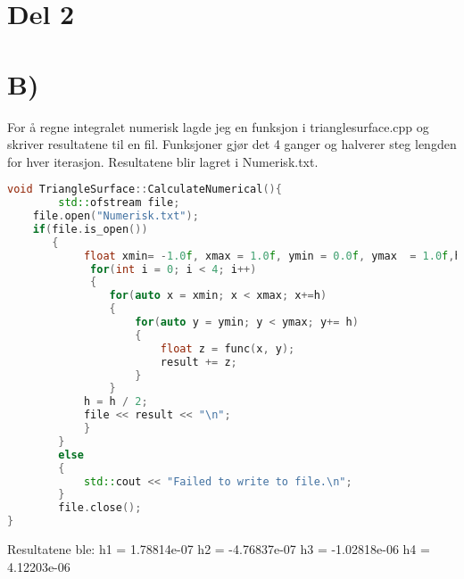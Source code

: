 \documentclass[a4paper,norsk]{article}
\begin{document}
\section{Del 2}
\section{B)}
For å regne integralet numerisk lagde jeg en funksjon i trianglesurface.cpp og skriver resultatene til en fil.
Funksjoner gjør det 4 ganger og halverer steg lengden for hver iterasjon. Resultatene blir lagret i Numerisk.txt.
\begin{lstlisting}[language=C++, caption={trianglesurface.cpp}]
void TriangleSurface::CalculateNumerical(){
    	std::ofstream file;
   	file.open("Numerisk.txt");
	if(file.is_open())
       {
        	float xmin= -1.0f, xmax = 1.0f, ymin = 0.0f, ymax  = 1.0f,h = 0.25f, result = 0;
             for(int i = 0; i < 4; i++)
             {
                for(auto x = xmin; x < xmax; x+=h)
                {
                    for(auto y = ymin; y < ymax; y+= h)
                    {
                        float z = func(x, y);
                        result += z;
                    }
                }
            h = h / 2;
            file << result << "\n";
            }
        }
        else
        {
            std::cout << "Failed to write to file.\n";
        }
        file.close();
}
\end{lstlisting}
Resultatene ble:
h1 = 1.78814e-07
h2 = -4.76837e-07
h3 = -1.02818e-06
h4 = 4.12203e-06
\end{document}
